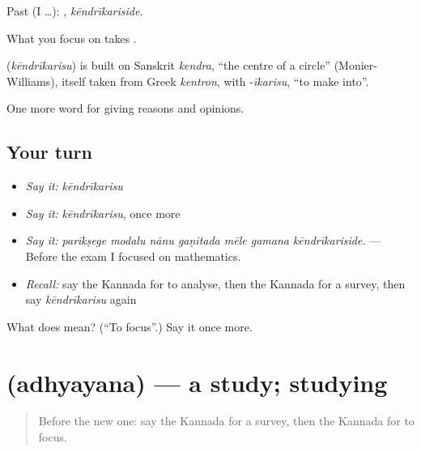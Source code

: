 Past (I …): , \emph{kēndrīkariside}.

What you focus on takes .

\begin{cousinweb}
\textbf{} (\emph{kēndrīkarisu}) is built on Sanskrit \emph{kendra}, \textquotedblleft{}the centre of a circle\textquotedblright{} (Monier-Williams), itself taken from Greek \emph{kentron}, with -\emph{īkarisu}, \textquotedblleft{}to make into\textquotedblright{}.
\end{cousinweb}

\begin{grammarlens}[title={What you've built}]
One more word for giving reasons and opinions.
\end{grammarlens}

\subsection*{Your turn}
\begin{itemize}
\raggedright
  \item \emph{Say it:} \emph{kēndrīkarisu}
  \item \emph{Say it:} \emph{kēndrīkarisu}, once more
  \item \emph{Say it:} \emph{parīkṣege modalu nānu gaṇitada mēle gamana kēndrīkariside.} — Before the exam I focused on mathematics.
  \item \emph{Recall:} say the Kannada for to analyse, then the Kannada for a survey, then say \emph{kēndrīkarisu} again
\end{itemize}

\begin{tcolorbox}[breakable,colback=teal!4,colframe=teal!35!black,title={Before you move on}]
What does  mean? (\textquotedblleft{}To focus\textquotedblright{}.) Say it once more.
\end{tcolorbox}
\section[\texorpdfstring{\kn{ಅಧ್ಯಯನ} (adhyayana)}{ಅಧ್ಯಯನ (adhyayana)}]{ (adhyayana) — a study; studying}

\label{lesson:KA-C408-adhyayana}



\begin{quote}
Before the new one: say the Kannada for a survey, then the Kannada for to focus.
\end{quote}

